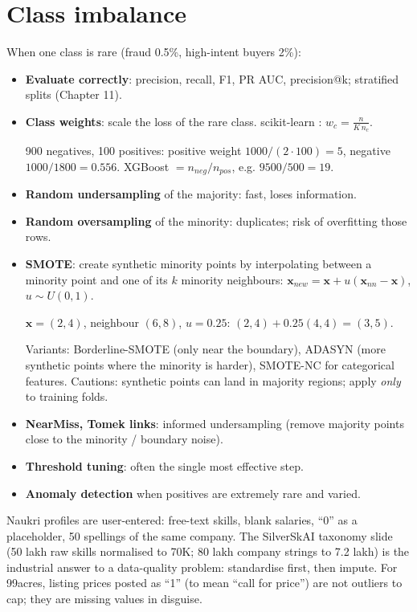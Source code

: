 \section{Class imbalance}
When one class is rare (fraud 0.5\%, high-intent buyers 2\%):
\begin{itemize}
\item \textbf{Evaluate correctly}: precision, recall, F1, PR AUC, precision@k; stratified splits (Chapter 11).
\item \textbf{Class weights}: scale the loss of the rare class. scikit-learn : $w_c = \frac{n}{K\,n_c}$.
  \begin{example}
  900 negatives, 100 positives: positive weight $1000/(2\cdot100) = 5$, negative $1000/1800 = 0.556$. XGBoost
   $= n_{neg}/n_{pos}$, e.g. $9500/500 = 19$.
  \end{example}
\item \textbf{Random undersampling} of the majority: fast, loses information.
\item \textbf{Random oversampling} of the minority: duplicates; risk of overfitting those rows.
\item \textbf{SMOTE}: create synthetic minority points by interpolating between a minority point and one of its $k$ minority neighbours:
  $\mathbf x_{new} = \mathbf x + u(\mathbf x_{nn} - \mathbf x)$, $u\sim U(0,1)$.
  \begin{example}[: SMOTE]
  $\mathbf x = (2,4)$, neighbour $(6,8)$, $u = 0.25$: $(2,4) + 0.25(4,4) = (3,5)$.
  \end{example}
  Variants: Borderline-SMOTE (only near the boundary), ADASYN (more synthetic points where the minority is harder), SMOTE-NC for
  categorical features. Cautions: synthetic points can land in majority regions; apply \emph{only} to training folds.
\item \textbf{NearMiss, Tomek links}: informed undersampling (remove majority points close to the minority / boundary noise).
\item \textbf{Threshold tuning}: often the single most effective step.
\item \textbf{Anomaly detection} when positives are extremely rare and varied.
\end{itemize}

\begin{practical}
Naukri profiles are user-entered: free-text skills, blank salaries, ``0'' as a placeholder, 50 spellings of the same company. The SilverSkAI
taxonomy slide (50 lakh raw skills normalised to 70K; 80 lakh company strings to 7.2 lakh) is the industrial answer to a data-quality
problem: standardise first, then impute. For 99acres, listing prices posted as ``1'' (to mean ``call for price'') are not outliers to
cap; they are missing values in disguise.
\end{practical}

